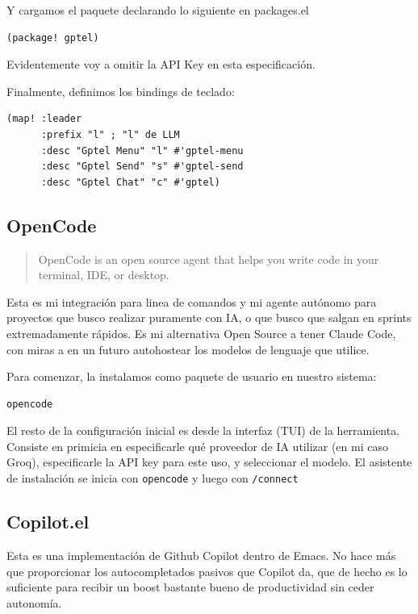 \documentclass[11pt]{article}
\begin{document}
Y cargamos el paquete declarando lo siguiente en packages.el
\begin{verbatim}
(package! gptel)
\end{verbatim}

Evidentemente voy a omitir la API Key en esta especificación.

Finalmente, definimos los bindings de teclado:

\begin{verbatim}
(map! :leader
      :prefix "l" ; "l" de LLM
      :desc "Gptel Menu" "l" #'gptel-menu
      :desc "Gptel Send" "s" #'gptel-send
      :desc "Gptel Chat" "c" #'gptel)
\end{verbatim}
\subsection{OpenCode}
\label{sec:org90d69d5}

\begin{quote}
OpenCode is an open source agent that helps you write code in your terminal, IDE, or desktop.
\end{quote}

Esta es mi integración para linea de comandos y mi agente autónomo para proyectos que busco realizar puramente con IA, o que busco que salgan en sprints extremadamente rápidos. Es mi alternativa Open Source a tener Claude Code, con miras a en un futuro autohostear los modelos de lenguaje que utilice.

Para comenzar, la instalamos como paquete de usuario en nuestro sistema:

\begin{verbatim}
opencode
\end{verbatim}

El resto de la configuración inicial es desde la interfaz (TUI) de la herramienta. Consiste en primicia en especificarle qué proveedor de IA utilizar (en mi caso Groq), especificarle la API key para este uso, y seleccionar el modelo. El asistente de instalación se inicia con \texttt{opencode} y luego con \texttt{/connect}
\subsection{Copilot.el}
\label{sec:orgd0d086a}

Esta es una implementación de Github Copilot dentro de Emacs. No hace más que proporcionar los autocompletados pasivos que Copilot da, que de hecho es lo suficiente para recibir un boost bastante bueno de productividad sin ceder autonomía.
\end{document}
